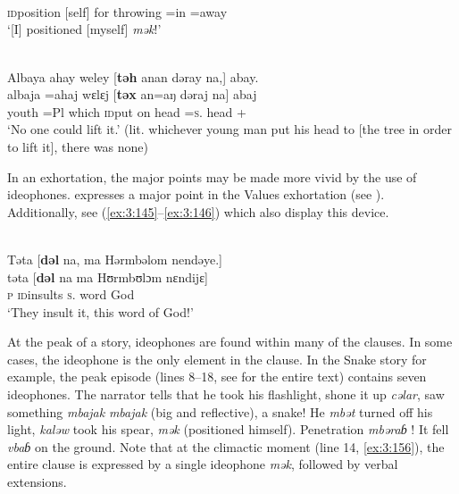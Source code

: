 \ea \label{ex:3:153}\\\\
\gll  [\textbf{mək}          =ava   =alaj]\\
      {\textsc{id}position [self] for throwing}  =in    =away \\
\glt  ‘[I] positioned [myself] \textit{mək}!’
\z

\ea \label{ex:3:154}\\
 Albaya ahay weley [\textbf{təh} anan dəray na,] abay.\\
\gll      albaja   =ahaj   wɛlɛj [\textbf{təx} an=aŋ dəraj   na]  abaj\\
      youth    =Pl    which   {\textsc{id}put on head}   {\DAT}=\textsc{s}.{\IO}   head   {\PSP}   {{\EXT}+{\NEG}}\\
\glt  ‘No one could lift it.’ (lit. whichever young man put his head to [the tree in order to lift it], there was none) 
\z

In an exhortation, the major points may be made more vivid by the use of ideophones.  expresses a major point in the Values exhortation (see ). Additionally, see (\ref{ex:3:145}--\ref{ex:3:146}) which also display this device.


\ea \label{ex:3:155}\\
Təta  [\textbf{dəl}  na,  ma  Hərmbəlom  nendəye.]\\
\gll  təta   [\textbf{dəl}     na   ma   Hʊrmbʊlɔm   nɛndijɛ]\\
      \textsc{p}  \textsc{id}insults  \textsc{s}.{\DO}  word  God    {\DEM}\\
\glt  ‘They insult it, this word of God!’ 
\z

At the peak of a story, ideophones are found within many of the clauses. In some cases, the ideophone is the only element in the clause. In the Snake story for example, the peak episode (lines 8--18, see  for the entire text) contains seven ideophones. The narrator tells that he took his flashlight, shone it up \textit{cəlar}, saw something \textit{mbajak} \textit{mbajak} (big and reflective), a snake! He \textit{mbət} turned off his light, \textit{kaləw} took his spear, \textit{mək} (positioned himself). Penetration \textit{mbəraɓ }! It fell \textit{vbaɓ} on the ground. Note that at the climactic moment (line 14, \ref{ex:3:156}), the entire clause is expressed by a single ideophone \textit{mək}, followed by verbal extensions.

